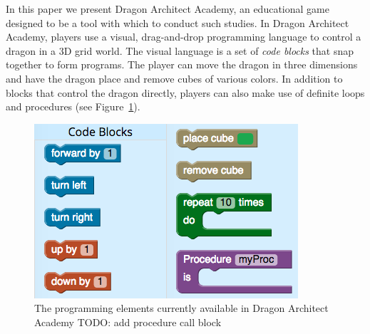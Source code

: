 \documentclass{sig-alternate}
\newcommand{\TODO}[1]{{\color{red} TODO: #1}}
\newcommand{\gametitle}{{\color{RoyalPurple} Dragon Architect Academy}}
\begin{document}

In this paper we present \gametitle{}, an educational game designed to be a tool with which to conduct such studies. 
In \gametitle{}, players use a visual, drag-and-drop programming language to control a dragon in a 3D grid world. 
The visual language is a set of \emph{code blocks} that snap together to form programs. 
The player can move the dragon in three dimensions and have the dragon place and remove cubes of various colors. 
In addition to blocks that control the dragon directly, players can also make use of definite loops and procedures (see Figure~\ref{fig:toolbox}).

\begin{figure}[ht]
  \centering
  \includegraphics[width=\columnwidth]{images/toolbox_wide}
  \caption{The programming elements currently available in \gametitle{} \TODO{add procedure call block}}
  \label{fig:toolbox}
\end{figure}
\end{document}
